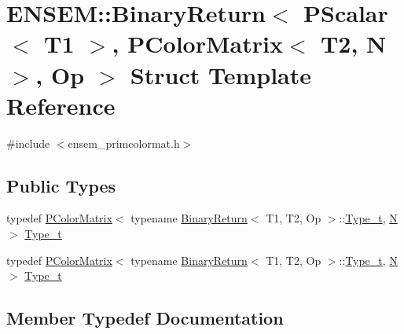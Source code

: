 \hypertarget{structENSEM_1_1BinaryReturn_3_01PScalar_3_01T1_01_4_00_01PColorMatrix_3_01T2_00_01N_01_4_00_01Op_01_4}{}\section{E\+N\+S\+EM\+:\+:Binary\+Return$<$ P\+Scalar$<$ T1 $>$, P\+Color\+Matrix$<$ T2, N $>$, Op $>$ Struct Template Reference}
\label{structENSEM_1_1BinaryReturn_3_01PScalar_3_01T1_01_4_00_01PColorMatrix_3_01T2_00_01N_01_4_00_01Op_01_4}


{\ttfamily \#include $<$ensem\+\_\+primcolormat.\+h$>$}

\subsection*{Public Types}
\begin{DoxyCompactItemize}
\item 
typedef \mbox{\hyperlink{classENSEM_1_1PColorMatrix}{P\+Color\+Matrix}}$<$ typename \mbox{\hyperlink{structENSEM_1_1BinaryReturn}{Binary\+Return}}$<$ T1, T2, Op $>$\+::\mbox{\hyperlink{structENSEM_1_1BinaryReturn_3_01PScalar_3_01T1_01_4_00_01PColorMatrix_3_01T2_00_01N_01_4_00_01Op_01_4_a97b44a952bd9e0913c09d9be8de65a5e}{Type\+\_\+t}}, \mbox{\hyperlink{operator__name__util_8cc_a7722c8ecbb62d99aee7ce68b1752f337}{N}} $>$ \mbox{\hyperlink{structENSEM_1_1BinaryReturn_3_01PScalar_3_01T1_01_4_00_01PColorMatrix_3_01T2_00_01N_01_4_00_01Op_01_4_a97b44a952bd9e0913c09d9be8de65a5e}{Type\+\_\+t}}
\item 
typedef \mbox{\hyperlink{classENSEM_1_1PColorMatrix}{P\+Color\+Matrix}}$<$ typename \mbox{\hyperlink{structENSEM_1_1BinaryReturn}{Binary\+Return}}$<$ T1, T2, Op $>$\+::\mbox{\hyperlink{structENSEM_1_1BinaryReturn_3_01PScalar_3_01T1_01_4_00_01PColorMatrix_3_01T2_00_01N_01_4_00_01Op_01_4_a97b44a952bd9e0913c09d9be8de65a5e}{Type\+\_\+t}}, \mbox{\hyperlink{operator__name__util_8cc_a7722c8ecbb62d99aee7ce68b1752f337}{N}} $>$ \mbox{\hyperlink{structENSEM_1_1BinaryReturn_3_01PScalar_3_01T1_01_4_00_01PColorMatrix_3_01T2_00_01N_01_4_00_01Op_01_4_a97b44a952bd9e0913c09d9be8de65a5e}{Type\+\_\+t}}
\end{DoxyCompactItemize}


\subsection{Member Typedef Documentation}
\mbox{\label{structENSEM_1_1BinaryReturn_3_01PScalar_3_01T1_01_4_00_01PColorMatrix_3_01T2_00_01N_01_4_00_01Op_01_4_a97b44a952bd9e0913c09d9be8de65a5e}} 
